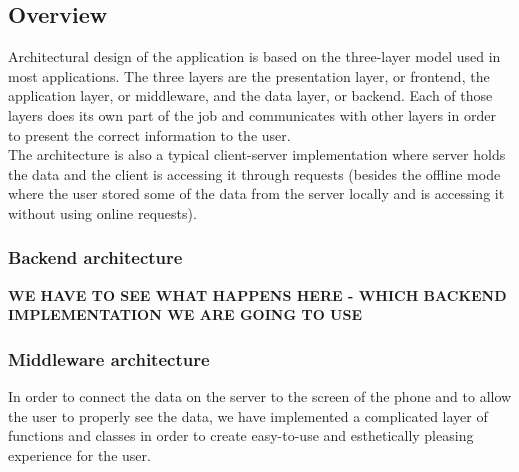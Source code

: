 \subsection{Overview}
\hspace{\parindent}Architectural design of the application is based on the three-layer model used in most applications. The three layers are the presentation layer, or frontend, the application layer, or middleware, and the data layer, or backend. Each of those layers does its own part of the job and communicates with other layers in order to present the correct information to the user.\\
The architecture is also a typical client-server implementation where server holds the data and the client is accessing it through requests (besides the offline mode where the user stored some of the data from the server locally and is accessing it without using online requests).\\
\subsubsection{Backend architecture}
\textbf{WE HAVE TO SEE WHAT HAPPENS HERE - WHICH BACKEND IMPLEMENTATION WE ARE GOING TO USE}
\subsubsection{Middleware architecture}
In order to connect the data on the server to the screen of the phone and to allow the user to properly see the data, we have implemented a complicated layer of functions and classes in order to create easy-to-use and esthetically pleasing experience for the user.

